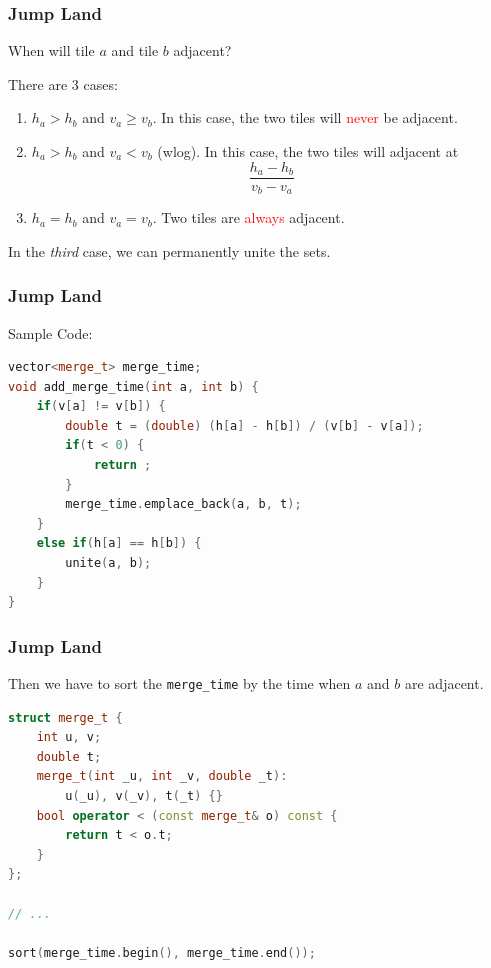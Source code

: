 \begin{frame}
\frametitle{Jump Land}
When will tile $a$ and tile $b$ adjacent?

There are $3$ cases:

\begin{enumerate}
    \item $h_a > h_b$ and $v_a \ge v_b$. In this case, the two tiles will \textcolor{red}{never} be adjacent.
    \item $h_a > h_b$ and $v_a < v_b$ (wlog). In this case, the two tiles will adjacent at
    \begin{equation}
        \nonumber
        \frac{h_a - h_b}{v_b - v_a}
    \end{equation}
    \item $h_a = h_b$ and $v_a = v_b$. Two tiles are \textcolor{red}{always} adjacent.
\end{enumerate}


In the \textit{third} case, we can permanently unite the sets.

\end{frame}

\begin{frame}[fragile]
\frametitle{Jump Land}
Sample Code:

\begin{lstlisting}[language=C++, basicstyle=\small]
vector<merge_t> merge_time;
void add_merge_time(int a, int b) {
    if(v[a] != v[b]) {
        double t = (double) (h[a] - h[b]) / (v[b] - v[a]);
        if(t < 0) {
            return ;
        }
        merge_time.emplace_back(a, b, t);
    }
    else if(h[a] == h[b]) {
        unite(a, b);
    }
}
\end{lstlisting}

\end{frame}

\begin{frame}[fragile]
\frametitle{Jump Land}
Then we have to sort the \verb|merge_time| by the time when $a$ and $b$ are adjacent.

\begin{lstlisting}[language=C++, basicstyle=\small]
struct merge_t {
    int u, v;
    double t;
    merge_t(int _u, int _v, double _t):
        u(_u), v(_v), t(_t) {}
    bool operator < (const merge_t& o) const {
        return t < o.t;
    }
};

// ...

sort(merge_time.begin(), merge_time.end());
\end{lstlisting}

\end{frame}


